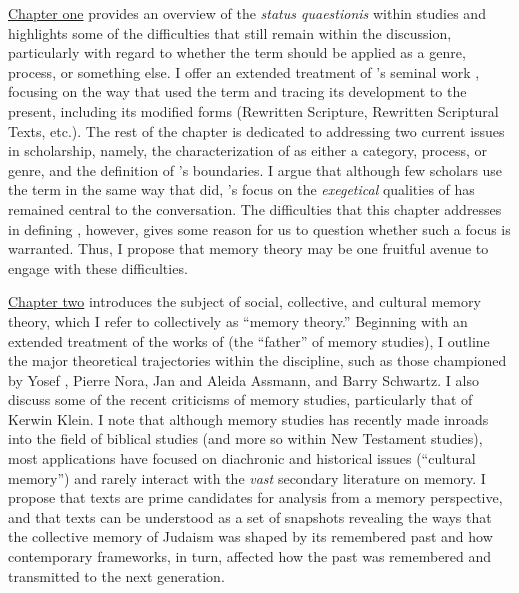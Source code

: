 \hyperref[chap:rwb]{Chapter one} provides an overview of the \emph{status quaestionis} within \rwb studies and highlights some of the difficulties that still remain within the discussion, particularly with regard to whether the term should be applied as a genre, process, or something else. I offer an extended treatment of \vermes's seminal work , focusing on the way that \vermes used the term and tracing its development to the present, including its modified forms (Rewritten Scripture, Rewritten Scriptural Texts, etc.). The rest of the chapter is dedicated to addressing two current issues in \rwb scholarship, namely, the characterization of \rwb as either a category, process, or genre, and the definition of \rwb's boundaries. I argue that although few scholars use the term \rwb in the same way that \vermes did, \vermes's focus on the \emph{exegetical} qualities of \rwb has remained central to the conversation. The difficulties that this chapter addresses in defining \rwb, however, gives some reason for us to question whether such a focus is warranted. Thus, I propose that memory theory may be one fruitful avenue to engage with these difficulties.

\hyperref[chap:memory]{Chapter two} introduces the subject of social, collective, and cultural memory theory, which I refer to collectively as ``memory theory.'' Beginning with an extended treatment of the works of \Halbwachs (the ``father'' of memory studies), I outline the major theoretical trajectories within the discipline, such as those championed by Yosef \yerushalmi, Pierre Nora, Jan and Aleida Assmann, and Barry Schwartz. I also discuss some of the recent criticisms of memory studies, particularly that of Kerwin Klein. I note that although memory studies has recently made inroads into the field of biblical studies (and more so within New Testament studies), most applications have focused on diachronic and historical issues (``cultural memory'') and rarely interact with the \emph{vast} secondary literature on memory. I propose that \rwb texts are prime candidates for analysis from a memory perspective, and that \rwb texts can be understood as a set of snapshots revealing the ways that the collective memory of \secondtemple Judaism was shaped by its remembered past and how contemporary frameworks, in turn, affected how the past was remembered and transmitted to the next generation.

